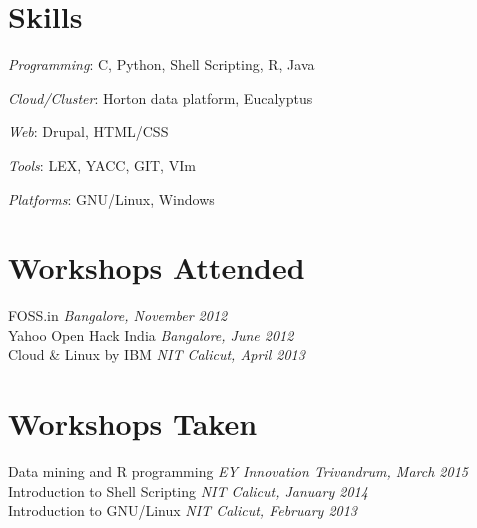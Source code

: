 \documentclass[margin,line]{resume}
\begin{document}
\begin{resume}
   \section{\mysidestyle Skills} 
    	\begin{list2}
	\item \textit{Programming}: C, Python, Shell Scripting, R, Java
	\item \textit{Cloud/Cluster}: Horton data platform, Eucalyptus	
	\item \textit{Web}: Drupal, HTML/CSS	
	\item \textit{Tools}: LEX, YACC, GIT, VIm
	
	\item \textit{Platforms}: GNU/Linux, Windows
	\end{list2}


    \section{\mysidestyle Workshops Attended} 
	FOSS.in \hfill \textit{Bangalore, November 2012}  \\%
    Yahoo Open Hack India \hfill \textit{Bangalore, June 2012}    \\
    Cloud \& Linux by IBM \hfill \textit{NIT Calicut, April 2013}    \\

            


    \section{\mysidestyle Workshops Taken} 
	Data mining and R programming \hfill \textit{EY Innovation Trivandrum, March 2015}    \\
	Introduction to Shell Scripting \hfill \textit{NIT Calicut, January 2014}    \\    	
	Introduction to GNU/Linux \hfill \textit{NIT Calicut, February 2013}    \\
		    			


\end{resume}
\end{document}
